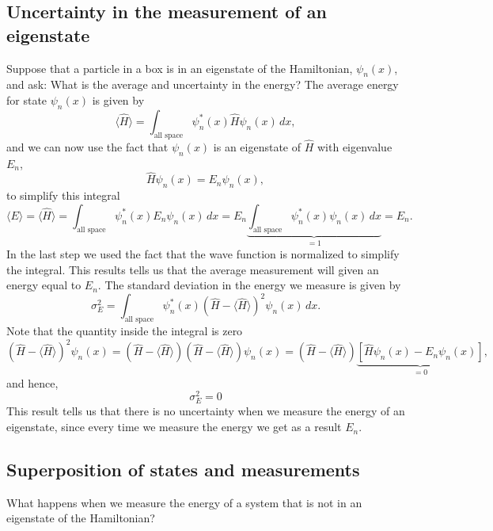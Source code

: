 \documentclass[../Main/chem331-notes.tex]{subfiles}
\begin{document}
\subsection{Uncertainty in the measurement of an eigenstate}
Suppose that a particle in a box is in an eigenstate of the Hamiltonian, $\psi_n(x)$, and ask: What is the average and uncertainty in the energy?
The average energy for state $\psi_n(x)$ is given by
\begin{equation}
\langle \hat{H} \rangle =  \int_\text{all space} \psi_n^*(x) \hat{H} \psi_n(x) \, dx,
\end{equation}
and we can now use the fact that $\psi_n(x)$ is an eigenstate of $\hat{H}$ with eigenvalue $E_n$,
\begin{equation}
\hat{H} \psi_n(x) = E_n \psi_n(x),
\end{equation}
to simplify this integral
\begin{equation}
\langle E \rangle = \langle \hat{H} \rangle =  \int_\text{all space} \psi_n^*(x) E_n \psi_n(x) \, dx 
=  E_n \underbrace{\int_\text{all space} \psi_n^*(x) \psi_n(x) \, dx}_{= 1} = E_n.
\end{equation}
In the last step we used the fact that the wave function is normalized to simplify the integral.
This results tells us that the average measurement will given an energy equal to $E_n$.
The standard deviation in the energy we measure is given by
\begin{equation}
\sigma^2_E
= \int_\text{all space} \psi_n^*(x) (\hat{H} - \langle \hat{H} \rangle)^2 \psi_n(x) \, dx.
\end{equation}
Note that the quantity inside the integral is zero
\begin{equation}
(\hat{H} - \langle \hat{H} \rangle)^2 \psi_n(x) = (\hat{H} - \langle \hat{H} \rangle) (\hat{H} - \langle \hat{H} \rangle)\psi_n(x) = (\hat{H} - \langle \hat{H} \rangle) \underbrace{\left[\hat{H} \psi_n(x) - E_n \psi_n(x)\right]}_{= 0},
\end{equation}
and hence, 
\begin{equation}
\sigma^2_E = 0
\end{equation}
This result tells us that there is no uncertainty when we measure the energy of an eigenstate, since every time we measure the energy we get as a result $E_n$.

\subsection{Superposition of states and measurements}
What happens when we measure the energy of a system that is not in an eigenstate of the Hamiltonian?
\end{document}
